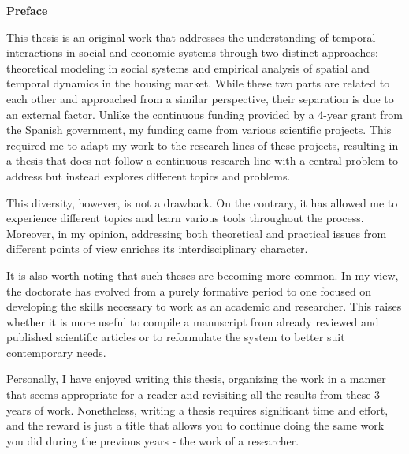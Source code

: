 \pagebreak
\thispagestyle{empty}
\textbf{ \huge Preface}

\vspace*{0.5 cm}

This thesis is an original work that addresses the understanding of temporal interactions in social and economic systems through two distinct approaches: theoretical modeling in social systems and empirical analysis of spatial and temporal dynamics in the housing market. While these two parts are related to each other and approached from a similar perspective, their separation is due to an external factor. Unlike the continuous funding provided by a 4-year grant from the Spanish government, my funding came from various scientific projects. This required me to adapt my work to the research lines of these projects, resulting in a thesis that does not follow a continuous research line with a central problem to address but instead explores different topics and problems.

This diversity, however, is not a drawback. On the contrary, it has allowed me to experience different topics and learn various tools throughout the process. Moreover, in my opinion, addressing both theoretical and practical issues from different points of view enriches its interdisciplinary character.

It is also worth noting that such theses are becoming more common. In my view, the doctorate has evolved from a purely formative period to one focused on developing the skills necessary to work as an academic and researcher. This raises whether it is more useful to compile a manuscript from already reviewed and published scientific articles or to reformulate the system to better suit contemporary needs.

Personally, I have enjoyed writing this thesis, organizing the work in a manner that seems appropriate for a reader and revisiting all the results from these 3 years of work. Nonetheless, writing a thesis requires significant time and effort, and the reward is just a title that allows you to continue doing the same work you did during the previous years - the work of a researcher.



\vfill